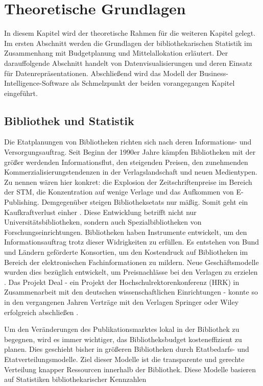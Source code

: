 \chapter{Theoretische Grundlagen}
\label{chap:two}
In diesem Kapitel wird der theoretische Rahmen für die weiteren Kapitel gelegt. Im
ersten Abschnitt werden die Grundlagen der bibliothekarischen Statistik im Zusammenhang mit Budgetplanung
und Mittelallokation erläutert. Der darauffolgende Abschnitt handelt von Datenvisualisierungen und deren Einsatz
für  Datenrepräsentationen. Abschließend wird das Modell der Business-Intelligence-Software als Schmelzpunkt der 
beiden vorangegangen Kapitel eingeführt.

\section{Bibliothek und Statistik}
\label{chap:two_one}
Die Etatplanungen von Bibliotheken richten sich nach deren Informations- und Versorgungsauftrag. 
Seit Beginn der 1990er Jahre kämpfen Bibliotheken mit der größer werdenden Informationsflut, den steigenden Preisen, 
den zunehmenden Kommerzialisierungstendenzen in der Verlagslandschaft und neuen Medientypen. 
Zu nennen wären hier konkret: die Explosion der Zeitschriftenpreise im Bereich der \acrfull{STM}, die Konzentration auf wenige Verlage und
das Aufkommen von E-Publishing. Demgegenüber steigen Bibliotheksetats nur mäßig. 
Somit geht ein Kaufkraftverlust einher \cite[vgl.][161]{moravetz-kuhlmann_monika_erwerbungspolitik_2015}.
Diese Entwicklung betrifft nicht nur Universitätsbibliotheken, sondern auch Spezialbibliotheken von Forschungseinrichtungen.
Bibliotheken haben Instrumente entwickelt, um den Informationsauftrag trotz dieser Widrigkeiten zu erfüllen.
Es entstehen von Bund und Ländern geförderte Konsortien, um den Kostendruck auf Bibliotheken im Bereich der elektronischen
Fachinformationen zu mildern. Neue Geschäftsmodelle wurden dies bezüglich entwickelt, um Preisnachlässe bei den Verlagen zu erzielen
\cite[vgl.][169 ff.]{moravetz-kuhlmann_monika_erwerbungspolitik_2015}. Das Projekt Deal - ein Projekt der Hochschulrektorenkonferenz (HRK) in Zusammenarbeit mit den
deutschen wissenschaftlichen Einrichtungen - konnte so in den vergangenen Jahren Verträge mit den Verlagen Springer oder Wiley erfolgreich abschließen \cite[vgl.][]{projekt_deal_projekt_2020}.

Um den Veränderungen des Publikationsmarktes lokal in der Bibliothek zu begegnen, wird es immer wichtiger, das Bibliotheksbudget kosteneffizient zu planen. 
Dies geschieht bisher in größeren Bibliotheken durch Etatbedarfs- und Etatverteilungsmodelle. 
Ziel dieser Modelle ist die transparente und gerechte Verteilung knapper Ressourcen innerhalb der Bibliothek. 
Diese Modelle basieren auf Statistiken bibliothekarischer Kennzahlen \cite[vgl.][172 ff.]{moravetz-kuhlmann_monika_erwerbungspolitik_2015}

